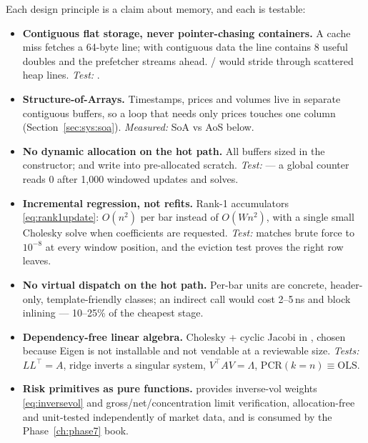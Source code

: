 Each design principle is a claim about memory, and each is testable:

\begin{itemize}
  \item \textbf{Contiguous flat storage, never pointer-chasing containers.} A cache miss
    fetches a 64-byte line; with contiguous data the line contains 8 useful doubles and the
    prefetcher streams ahead. / would stride through
    scattered heap lines. \emph{Test:} .
  \item \textbf{Structure-of-Arrays.} Timestamps, prices and volumes live in separate
    contiguous buffers, so a loop that needs only prices touches one column
    (Section~\ref{sec:sys:soa}). \emph{Measured:} SoA vs AoS below.
  \item \textbf{No dynamic allocation on the hot path.} All buffers sized in the
    constructor;  and  write into pre-allocated scratch.
    \emph{Test:}  --- a global
     counter reads 0 after 1{,}000 windowed updates and solves.
  \item \textbf{Incremental regression, not refits.} Rank-1 accumulators
    \eqref{eq:rank1update}: $O(n^2)$ per bar instead of $O(Wn^2)$, with a single small
    Cholesky solve when coefficients are requested. \emph{Test:} matches brute force to
    $10^{-8}$ at every window position, and the eviction test proves the right row leaves.
  \item \textbf{No virtual dispatch on the hot path.} Per-bar units are concrete,
    header-only, template-friendly classes; an indirect call would cost 2--5\,ns and block
    inlining --- 10--25\% of the cheapest stage.
  \item \textbf{Dependency-free linear algebra.} Cholesky + cyclic Jacobi in
    , chosen because Eigen is not installable and not vendable at a
    reviewable size. \emph{Tests:} $LL^{\top}=A$, ridge inverts a singular system,
    $V^{\top}AV=\Lambda$, $\mathrm{PCR}(k{=}n)\equiv\mathrm{OLS}$.
  \item \textbf{Risk primitives as pure functions.}  provides
    inverse-vol weights \eqref{eq:inversevol} and gross/net/concentration limit
    verification, allocation-free and unit-tested independently of market data, and is
    consumed by the Phase~\ref{ch:phase7} book.
\end{itemize}

